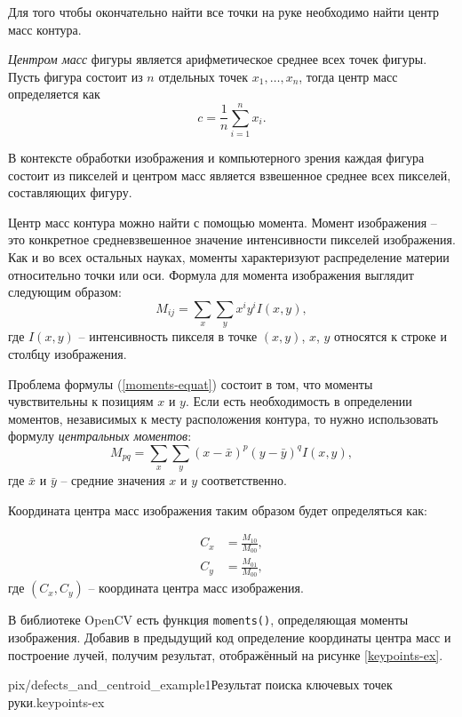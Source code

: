 Для того чтобы окончательно найти все точки на руке необходимо найти
центр масс контура. 

{\it Центром масс} фигуры является арифметическое среднее всех точек
фигуры. Пусть фигура состоит из $n$ отдельных точек 
$x_1, \ldots, x_n$, тогда центр масс определяется как
$$ c = \frac{1}{n}\sum_{i=1}^n{x_i}. $$

В контексте обработки изображения и компьютерного зрения каждая фигура
состоит из пикселей и центром масс является взвешенное среднее всех
пикселей, составляющих фигуру.

Центр масс контура можно найти с помощью {момента}. Момент изображения
-- это конкретное средневзвешенное значение интенсивности пикселей
изображения. Как и во всех остальных науках, моменты характеризуют
распределение материи относительно точки или оси. Формула для
момента изображения выглядит следующим образом:
\begin{equation}
M_{ij} = \sum_x{\sum_y{x^iy^iI(x,y)}}, 
\label{moments-equat}
\end{equation}
где $I(x,y)$ -- интенсивность пикселя в точке $(x,y)$,
$x$, $y$ относятся к строке и столбцу изображения. 

Проблема формулы (\ref{moments-equat}) состоит в том, что
моменты чувствительны к позициям $x$ и $y$. Если есть необходимость
в определении моментов, независимых к месту расположения контура, то
нужно использовать формулу {\it центральных моментов}:
$$M_{pq} = \sum_x{\sum_y{(x-\bar x)^p(y-\bar y)^qI(x,y)}}, $$
где $\bar x$ и $\bar y$ -- средние значения $x$ и $y$ соответственно.

Координата центра масс изображения таким образом будет определяться
как:

\begin{equation}
	\begin{aligned}
		C_x&=\frac{M_{10}}{M_{00}}, \\
		C_y&=\frac{M_{01}}{M_{00}},
	\end{aligned}
	\label{centroid-equat}
\end{equation}
где $(C_x, C_y)$ -- координата центра масс изображения.

В библиотеке OpenCV есть функция {\tt moments()}, определяющая
моменты изображения. Добавив в предыдущий код определение
координаты центра масс и построение лучей, получим результат, 
отображённый на рисунке \ref{keypoints-ex}.

{pix/defects_and_centroid_example1}{Результат поиска ключевых точек
руки.}{keypoints-ex}

